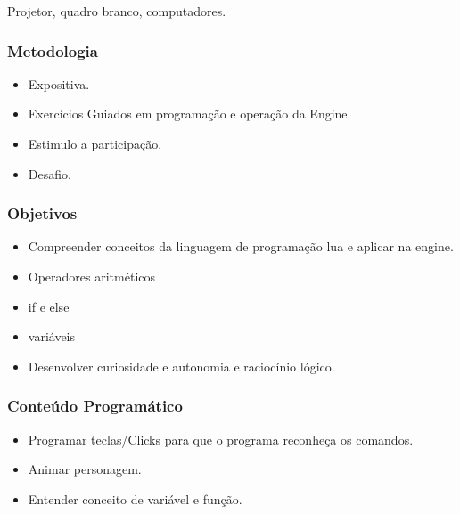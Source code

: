 \documentclass[letterpaper,10pt,brazil]{sphinxmanual}
\begin{document}
\sphinxAtStartPar
Projetor, quadro branco, computadores.
\subsubsection*{Metodologia}
\begin{itemize}
\item {} 
\sphinxAtStartPar
Expositiva.

\item {} 
\sphinxAtStartPar
Exercícios Guiados em programação e operação da Engine.

\item {} 
\sphinxAtStartPar
Estimulo a participação.

\item {} 
\sphinxAtStartPar
Desafio.

\end{itemize}
\subsubsection*{Objetivos}
\begin{itemize}
\item {} 
\sphinxAtStartPar
Compreender conceitos da linguagem de programação lua e aplicar na engine.

\item {} 
\sphinxAtStartPar
Operadores aritméticos

\item {} 
\sphinxAtStartPar
if e else

\item {} 
\sphinxAtStartPar
variáveis

\item {} 
\sphinxAtStartPar
Desenvolver curiosidade e autonomia e raciocínio lógico.

\end{itemize}
\subsubsection*{Conteúdo Programático}
\begin{itemize}
\item {} 
\sphinxAtStartPar
Programar teclas/Clicks para que o programa reconheça os comandos.

\item {} 
\sphinxAtStartPar
Animar personagem.

\item {} 
\sphinxAtStartPar
Entender conceito de variável e função.

\end{itemize}
\end{document}
